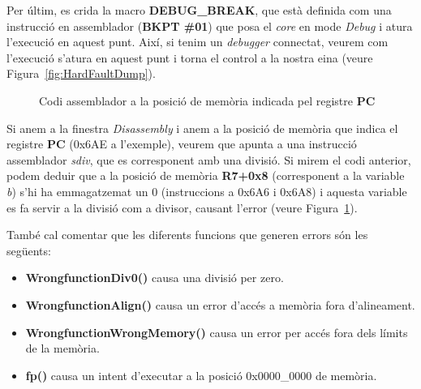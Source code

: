 Per últim, es crida la macro {\bf DEBUG\_BREAK}, que està definida com una instrucció en assemblador ({\bf BKPT \#01}) que posa el {\em core} en mode {\em Debug} i atura l'execució en aquest punt. Així, si tenim un {\em debugger} connectat, veurem com l'execució s'atura en aquest punt i torna el control a la nostra eina (veure Figura~\ref{fig:HardFaultDump}).


\begin{figure}
 \centering
 \caption{Codi assemblador a la posició de memòria indicada pel registre {\bf PC}}
 \label{fig:HardFaultDis}
\end{figure}

Si anem a la finestra {\em Disassembly} i anem a la posició de memòria que indica el registre {\bf PC} (0x6AE a l'exemple), veurem que apunta a una instrucció assemblador {\em sdiv}, que es corresponent amb una divisió. Si mirem el codi anterior, podem deduir que a la posició de memòria {\bf R7+0x8} (corresponent a la variable {\em b}) s'hi ha emmagatzemat un 0 (instruccions a 0x6A6 i 0x6A8) i aquesta variable es fa servir a la divisió com a divisor, causant l'error (veure Figura~\ref{fig:HardFaultDis}).

També cal comentar que les diferents funcions que generen errors són les següents:
\begin{itemize}
 \item {\bf WrongfunctionDiv0()} causa una divisió per zero.
 \item {\bf WrongfunctionAlign()} causa un error d'accés a memòria fora d'alineament.
 \item {\bf WrongfunctionWrongMemory()} causa un error per accés fora dels límits de la memòria.
 \item {\bf fp()} causa un intent d'executar a la posició 0x0000\_0000 de memòria.
\end{itemize}

